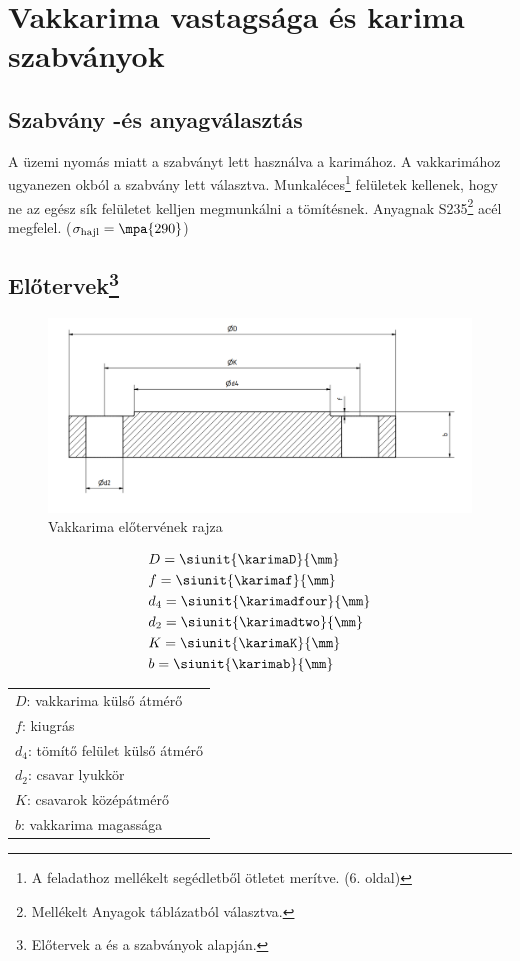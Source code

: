 \section{Vakkarima vastagsága és karima szabványok}

\subsection{Szabvány -és anyagválasztás}
A \siunit{\pu}{\bar} üzemi nyomás miatt a \karimaszabvany szabványt lett használva a karimához. A vakkarimához ugyanezen okból a \vakkarimaszabvany szabvány lett választva. Munkaléces\footnote{A feladathoz mellékelt segédletből ötletet merítve. (6. oldal)} felületek kellenek, hogy ne az egész sík felületet kelljen megmunkálni a tömítésnek. Anyagnak S235\footnote{Mellékelt Anyagok táblázatból választva.} acél megfelel. ($\sigma_\text{hajl} = \mpa{290}$)

\subsection[Előtervek]{Előtervek\protect\footnote{Előtervek a \karimaszabvany és a \vakkarimaszabvany szabványok alapján.}}
\begin{figure}[hbt!]
	\centering
	\includegraphics[scale=.25]{./images/vakkarima.png}
	\caption{Vakkarima előtervének rajza}
\end{figure}
\begin{align*}
	&D = \siunit{\karimaD}{\mm} \\
	&f = \siunit{\karimaf}{\mm} \\
	&d_4 = \siunit{\karimadfour}{\mm} \\
	&d_2 = \siunit{\karimadtwo}{\mm} \\
	&K = \siunit{\karimaK}{\mm} \\
	&b = \siunit{\karimab}{\mm} \\
\end{align*}
\begin{center}
	\begin{tabular}{l}
		$D$: vakkarima külső átmérő \siunit{}{\mm} \\
		$f$: kiugrás \siunit{}{\mm} \\
		$d_4$: tömítő felület külső átmérő \siunit{}{\mm} \\
		$d_2$: csavar lyukkör \siunit{}{\mm} \\
		$K$: csavarok középátmérő \siunit{}{\mm} \\
		$b$: vakkarima magassága \siunit{}{\mm} \\
	\end{tabular}
\end{center}

